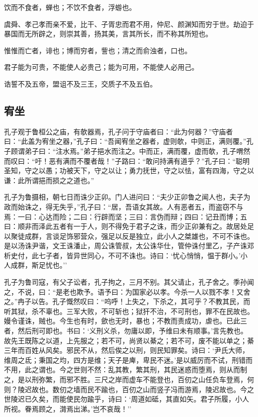 \documentclass[]{article}
\begin{document}
饮而不食者，蝉也；不饮不食者，浮蝣也。

虞舜、孝己孝而亲不爱，比干、子胥忠而君不用，仲尼、颜渊知而穷于世。劫迫于暴国而无所辟之，则崇其善，扬其美，言其所长，而不称其所短也。

惟惟而亡者，诽也；博而穷者，訾也；清之而俞浊者，口也。

君子能为可贵，不能使人必贵己；能为可用，不能使人必用己。

诰誓不及五帝，盟诅不及三王，交质子不及五伯。

\hypertarget{header-n120}{%
\subsection{宥坐}\label{header-n120}}

孔子观于鲁桓公之庙，有欹器焉，孔子问于守庙者曰：``此为何器？''守庙者曰：``此盖为宥坐之器，''孔子曰：``吾闻宥坐之器者，虚则欹，中则正，满则覆。''孔子顾谓弟子曰：``注水焉。''弟子挹水而注之。中而正，满而覆，虚而欹，孔子喟然而叹曰：``吁！恶有满而不覆者哉！''子路曰：``敢问持满有道乎？''孔子曰：``聪明圣知，守之以愚；功被天下，守之以让；勇力抚世，守之以怯，富有四海，守之以谦：此所谓挹而损之之道也。''

孔子为鲁摄相，朝七日而诛少正卯。门人进问曰：``夫少正卯鲁之闻人也，夫子为政而始诛之，得无失乎，''孔子曰：``居，吾语女其故。人有恶者五，而盗窃不与焉：一曰：心达而险；二曰：行辟而坚；三曰：言伪而辩；四曰：记丑而博；五曰：顺非而泽此五者有一于人，则不得免于君子之诛，而少正卯兼有之。故居处足以聚徒成群，言谈足饰邪营众，强足以反是独立，此小人之桀雄也，不可不诛也。是以汤诛尹谐，文王诛潘止，周公诛管叔，太公诛华仕，管仲诛付里乙，子产诛邓析史付，此七子者，皆异世同心，不可不诛也。诗曰：`忧心悄悄，愠于群小。'小人成群，斯足忧也。''

孔子为鲁司寇，有父子讼者，孔子拘之，三月不别。其父请止，孔子舍之。季孙闻之，不说，曰：``是老也欺予。语予曰：为国家必以孝。今杀一人以戮不孝！又舍之。''冉子以告。孔子慨然叹曰：``呜呼！上失之，下杀之，其可乎？不教其民，而听其狱，杀不辜也。三军大败，不可斩也；狱犴不治，不可刑也，罪不在民故也。嫚令谨诛，贼也。今生也有时，歛也无时，暴也；不教而责成功，虐也。已此三者，然后刑可即也。书曰：`义刑义杀，勿庸以即，予维曰未有顺事。'言先教也。故先王既陈之以道，上先服之；若不可，尚贤以綦之；若不可，废不能以单之；綦三年而百姓从风矣。邪民不从，然后俟之以刑，则民知罪矣。诗曰：`尹氏大师，维周之氐；秉国之均，四方是维；天子是庳，卑民不迷。'是以威厉而不试，刑错而不用，此之谓也。今之世则不然：乱其教，繁其刑，其民迷惑而堕焉，则从而制之，是以刑弥繁，而邪不胜。三尺之岸而虚车不能登也，百仞之山任负车登焉，何则？陵迟故也。数仞之墙而民不踰也，百仞之山而竖子冯而游焉，陵迟故也。今之世陵迟已久矣，而能使民勿踰乎，诗曰：`周道如砥，其直如矢。君子所履，小人所视。眷焉顾之，潸焉出涕。'岂不哀哉！''
\end{document}
